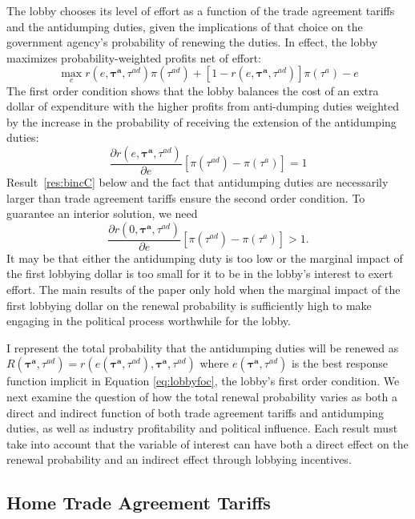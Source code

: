 \documentclass[10pt]{article}
\newcommand{\bta}{\bm{\tau^a}}
\newcommand{\tad}{\tau^{ad}}
\begin{document}
The lobby chooses its level of effort as a function of the trade agreement tariffs and the antidumping duties, given the implications of that choice on the government agency's probability of renewing the duties. In effect, the lobby maximizes probability-weighted profits net of effort:
\[
  \max_{e} r(e,\bta,\tad) \pi(\tau^{ad}) + [1 - r(e,\bta,\tad)] \pi(\tau^a) - e
\]
The first order condition shows that the lobby balances the cost of an extra dollar of expenditure with the higher profits from anti-dumping duties weighted by the increase in the probability of receiving the extension of the antidumping duties:
\begin{equation}
	\frac{\partial r(e,\bta,\tad)}{\partial e} \left[ \pi(\tau^{ad})  - \pi(\tau^a) \right] = 1 
	\label{eq:lobbyfoc}
\end{equation}
Result~\ref{res:bincC} below and the fact that antidumping duties are necessarily larger than trade agreement tariffs ensure the second order condition. To guarantee an interior solution, we need
  \begin{equation}
	  \frac{\partial r(0,\bta,\tad)}{\partial e} \left[ \pi(\tau^{ad}) - \pi(\tau^a) \right] > 1.
		\label{ine:lobint}	
  \end{equation}
It may be that either the antidumping duty is too low or the marginal impact of the first lobbying dollar is too small for it to be in the lobby's interest to exert effort. The main results of the paper only hold when the marginal impact of the first lobbying dollar on the renewal probability is sufficiently high to make engaging in the political process worthwhile for the lobby.
  
I represent the total probability that the antidumping duties will be renewed as $R(\bta,\tad)=r(e(\bta,\tad),\bta,\tad)$ where $e(\bta,\tad)$ is the best response function implicit in Equation \ref{eq:lobbyfoc}, the lobby's first order condition. We next examine the question of how the total renewal probability varies as both a direct and indirect function of both trade agreement tariffs and antidumping duties, as well as industry profitability and political influence. Each result must take into account that the variable of interest can have both a direct effect on the renewal probability and an indirect effect through lobbying incentives.


\bigskip
\subsection{Home Trade Agreement Tariffs}
\label{sec:home}
\end{document}
